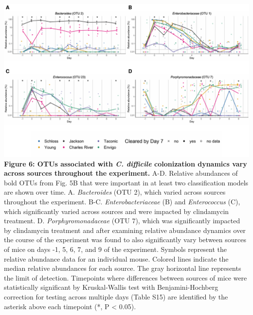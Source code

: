 \documentclass[
  11pt,
]{article}
\begin{document}
\includegraphics{figure_6.pdf} \textbf{Figure 6: OTUs associated with
\emph{C. difficile} colonization dynamics vary across sources throughout
the experiment.} A-D. Relative abundances of bold OTUs from Fig. 5B that
were important in at least two classification models are shown over
time. A. \emph{Bacteroides} (OTU 2), which varied across sources
throughout the experiment. B-C. \emph{Enterobacteriaceae} (B) and
\emph{Enterococcus} (C), which significantly varied across sources and
were impacted by clindamycin treatment. D. \emph{Porphyromonadaceae}
(OTU 7), which was significantly impacted by clindamycin treatment and
after examining relative abundance dynamics over the course of the
experiment was found to also significantly vary between sources of mice
on days -1, 5, 6, 7, and 9 of the experiment. Symbols represent the
relative abundance data for an individual mouse. Colored lines indicate
the median relative abundances for each source. The gray horizontal line
represents the limit of detection. Timepoints where differences between
sources of mice were statistically significant by Kruskal-Wallis test
with Benjamini-Hochberg correction for testing across multiple days
(Table S15) are identified by the asterisk above each timepoint (*, P
\textless{} 0.05).

\newpage
\end{document}
